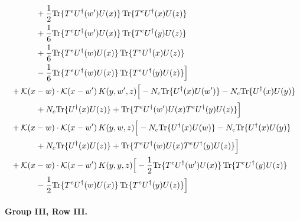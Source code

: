 \documentclass[10pt]{article}
\numberwithin{equation}{section}
\begin{document}
\begin{align}
&\quad\quad\quad+\frac{1}{2}{\rm Tr}\{T^eU^\dagger(w')U(x)\}\,{\rm Tr}\{T^eU^\dagger(x)U(z)\}\notag\\
&\quad\quad\quad+\frac{1}{6}{\rm Tr}\{T^eU^\dagger(w')U(x)\}\,{\rm Tr}\{T^eU^\dagger(y)U(z)\}\notag\\
&\quad\quad\quad+\frac{1}{6}{\rm Tr}\{T^eU^\dagger(w)U(x)\}\,{\rm Tr}\{T^eU^\dagger(x)U(z)\}\notag\\
&\quad\quad\quad-\frac{1}{6}{\rm Tr}\{T^eU^\dagger(w)U(x)\}\,{\rm Tr}\{T^eU^\dagger(y)U(z)\}\Big]\notag\\
&+\mathcal K(x-w)\cdot\mathcal K(x-w')\,K(y,w',z)\Big[-N_c{\rm Tr}\{U^\dagger(x)U(w')\}-N_c{\rm Tr}\{U^\dagger(x)U(y)\}\notag\\
&\quad\quad\quad+N_c{\rm Tr}\{U^\dagger(x)U(z)\}+{\rm Tr}\{T^eU^\dagger(w')U(x)T^eU^\dagger(y)U(z)\}\Big]\notag\\
&+\mathcal K(x-w)\cdot\mathcal K(x-w')\,K(y,w,z)\Big[-N_c{\rm Tr}\{U^\dagger(x)U(w)\}-N_c{\rm Tr}\{U^\dagger(x)U(y)\}\notag\\
&\quad\quad\quad+N_c{\rm Tr}\{U^\dagger(x)U(z)\}+{\rm Tr}\{T^eU^\dagger(w)U(x)T^eU^\dagger(y)U(z)\}\Big]\notag\\
&+\mathcal K(x-w)\cdot\mathcal K(x-w')\,K(y,y,z)\Big[-\frac{1}{2}{\rm Tr}\{T^eU^\dagger(w')U(x)\}\,{\rm Tr}\{T^eU^\dagger(y)U(z)\}\notag\\
&\quad\quad\quad-\frac{1}{2}{\rm Tr}\{T^eU^\dagger(w)U(x)\}\,{\rm Tr}\{T^eU^\dagger(y)U(z)\}\Big]
\label{eq:G3II}
\end{align}

\paragraph{Group III, Row III.}
\end{document}

